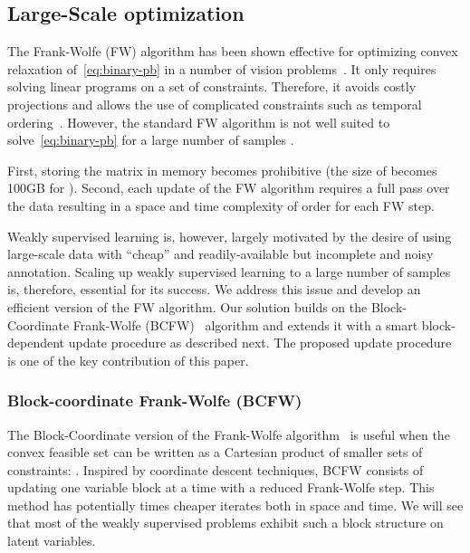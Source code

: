 \documentclass[10pt,twocolumn,letterpaper]{article}
\begin{document}
\subsection{Large-Scale optimization}
\label{large-scale-opt}


The Frank-Wolfe (FW) algorithm has been shown effective for optimizing convex relaxation of~\eqref{eq:binary-pb} in a number of vision problems~\cite{alayrac16unsupervised,bojanowski13finding,bojanowski14weakly,bojanowski15weakly,Joulin14efficient,seguin16instance}.
It only requires solving linear programs on a set of constraints.
Therefore, it avoids costly projections and allows the use of complicated constraints such as temporal ordering~\cite{bojanowski14weakly}.
However, the standard FW algorithm is not well suited to solve~\eqref{eq:binary-pb} for a large number of samples .

First, storing the  matrix  in memory becomes prohibitive (\eg the size of  becomes  100GB for ). 
Second, each update of the FW algorithm requires a full pass over the data resulting in a space and time complexity of order  for each FW step.

Weakly supervised learning is, however, largely motivated by the desire of using large-scale data with ``cheap'' and readily-available but incomplete and noisy annotation.
Scaling up weakly supervised learning to a large number of samples is, therefore, essential for its success.
We address this issue and develop an efficient version of the FW algorithm. Our solution builds on the Block-Coordinate Frank-Wolfe (BCFW)~\cite{lacoste13bcfw} algorithm and extends it with a smart block-dependent update procedure as described next.
The proposed update procedure is one of the key contribution of this paper.



\subsubsection{Block-coordinate Frank-Wolfe (BCFW)}\label{sec:BCFW}

The Block-Coordinate version of the Frank-Wolfe algorithm~\cite{lacoste13bcfw} is useful when the convex feasible set  can be written as a Cartesian product of  smaller sets of constraints: .
Inspired by coordinate descent techniques, BCFW consists of updating one variable block  at a time with a reduced Frank-Wolfe step.
This method has potentially  times cheaper iterates both in space and time. We will see  that most
of the weakly supervised problems exhibit such a block structure on latent variables.
\end{document}
